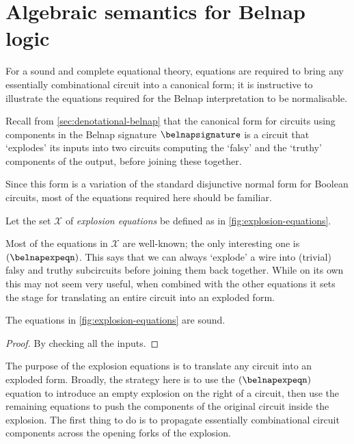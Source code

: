 \section{Algebraic semantics for Belnap logic}\label{sec:algebraic-belnap}

For a sound and complete equational theory, equations are required to bring any
essentially combinational circuit into a canonical form; it is instructive to
illustrate the equations required for the Belnap interpretation to be
normalisable.

Recall from \cref{sec:denotational-belnap} that the canonical form for circuits
using components in the Belnap signature \(\belnapsignature\) is a circuit that
`explodes' its inputs into two circuits computing the `falsy' and the `truthy'
components of the output, before joining these together.

Since this form is a variation of the standard disjunctive normal form for
Boolean circuits, most of the equations required here should be familiar.

\begin{definition}
    Let the set \(\mathcal{X}\) of \emph{explosion equations} be defined as
    in \cref{fig:explosion-equations}.
\end{definition}



Most of the equations in \(\mathcal{X}\) are well-known; the only interesting
one is \((\belnapexpeqn)\).
This says that we can always `explode' a wire into (trivial) falsy and truthy
subcircuits before joining them back together.
While on its own this may not seem very useful, when combined with the other
equations it sets the stage for translating an entire circuit into an exploded
form.

\begin{lemma}
    The equations in \cref{fig:explosion-equations} are sound.
\end{lemma}
\begin{proof}
    By checking all the inputs.
\end{proof}

The purpose of the explosion equations is to translate any circuit into an
exploded form.
Broadly, the strategy here is to use the \((\belnapexpeqn)\) equation to
introduce an empty explosion on the right of a circuit, then use the remaining
equations to push the components of the original circuit inside the explosion.
The first thing to do is to propagate essentially
combinational circuit components across the opening forks of the explosion.

